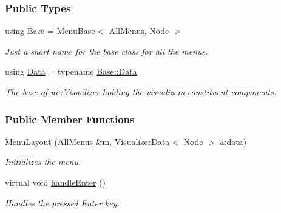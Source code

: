 \subsubsection*{Public Types}
\begin{DoxyCompactItemize}
\item 
using \hyperlink{structMenuLayout_ae61c2badc6eef1198d71def401fcaca3}{Base} = \hyperlink{structMenuBase}{Menu\+Base}$<$ \hyperlink{structAllMenus}{All\+Menus}, Node $>$\hypertarget{structMenuLayout_ae61c2badc6eef1198d71def401fcaca3}{}\label{structMenuLayout_ae61c2badc6eef1198d71def401fcaca3}

\begin{DoxyCompactList}\small\item\em Just a short name for the base class for all the menus. \end{DoxyCompactList}\item 
using \hyperlink{structMenuLayout_afcb99b17718fba03c7c5203d7a5a311a}{Data} = typename \hyperlink{structMenuBase_a473a45fd8adbc75a9220b64753ae3837}{Base\+::\+Data}\hypertarget{structMenuLayout_afcb99b17718fba03c7c5203d7a5a311a}{}\label{structMenuLayout_afcb99b17718fba03c7c5203d7a5a311a}

\begin{DoxyCompactList}\small\item\em The base of \hyperlink{structui_1_1Visualizer}{ui\+::\+Visualizer} holding the visualizer\textquotesingle{}s constituent components. \end{DoxyCompactList}\end{DoxyCompactItemize}
\subsubsection*{Public Member Functions}
\begin{DoxyCompactItemize}
\item 
\hyperlink{structMenuLayout_aa96374d40dd74ff63cfbd8840a6500ef}{Menu\+Layout} (\hyperlink{structAllMenus}{All\+Menus} \&m, \hyperlink{structVisualizerData}{Visualizer\+Data}$<$ Node $>$ \&\hyperlink{structMenuBase_a819aaaa06ede3bffbb12c1390657ef64}{data})
\begin{DoxyCompactList}\small\item\em Initializes the menu. \end{DoxyCompactList}\item 
virtual void \hyperlink{structMenuLayout_ae50bfe42ee3831fe6770df8c69a4b51b}{handle\+Enter} ()\hypertarget{structMenuLayout_ae50bfe42ee3831fe6770df8c69a4b51b}{}\label{structMenuLayout_ae50bfe42ee3831fe6770df8c69a4b51b}

\begin{DoxyCompactList}\small\item\em Handles the pressed Enter key. \end{DoxyCompactList}\end{DoxyCompactItemize}

